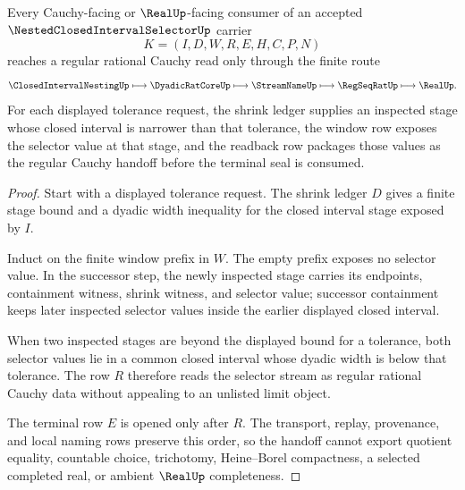 \begin{theorem}
\label{thm:nested-closed-interval-selector-cauchy-handoff}
Every Cauchy-facing or $\RealUp$-facing consumer of an accepted $\NestedClosedIntervalSelectorUp$ carrier
$$
K=(I,D,W,R,E,H,C,P,N)
$$
reaches a regular rational Cauchy read only through the finite route
$$
\ClosedIntervalNestingUp
\longmapsto
\DyadicRatCoreUp
\longmapsto
\StreamNameUp
\longmapsto
\RegSeqRatUp
\longmapsto
\RealUp .
$$
For each displayed tolerance request, the shrink ledger supplies an inspected stage whose closed interval is narrower than that tolerance, the window row exposes the selector value at that stage, and the readback row packages those values as the regular Cauchy handoff before the terminal seal is consumed.
\end{theorem}
\begin{proof}
Start with a displayed tolerance request. The shrink ledger $D$ gives a finite stage bound and a dyadic width inequality for the closed interval stage exposed by $I$.

Induct on the finite window prefix in $W$. The empty prefix exposes no selector value. In the successor step, the newly inspected stage carries its endpoints, containment witness, shrink witness, and selector value; successor containment keeps later inspected selector values inside the earlier displayed closed interval.

When two inspected stages are beyond the displayed bound for a tolerance, both selector values lie in a common closed interval whose dyadic width is below that tolerance. The row $R$ therefore reads the selector stream as regular rational Cauchy data without appealing to an unlisted limit object.

The terminal row $E$ is opened only after $R$. The transport, replay, provenance, and local naming rows preserve this order, so the handoff cannot export quotient equality, countable choice, trichotomy, Heine--Borel compactness, a selected completed real, or ambient $\RealUp$ completeness.
\end{proof}



